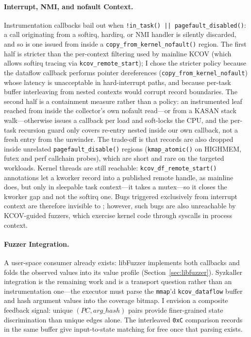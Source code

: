 \documentclass{article}
\begin{document}
\paragraph{Interrupt, NMI, and nofault Context.} Instrumentation callbacks bail
out when \texttt{!in\_task() || pagefault\_disabled()}: a call originating from
a softirq, hardirq, or NMI handler is silently discarded, and so is one issued
from inside a \texttt{copy\_from\_kernel\_nofault()} region.
The first half is stricter than the per-context filtering used by mainline KCOV
(which allows softirq tracing via \texttt{kcov\_remote\_start}); I chose
the stricter policy because the dataflow callback performs pointer
dereferences (\texttt{copy\_from\_kernel\_nofault}) whose latency is
unacceptable in hard-interrupt paths, and because per-task buffer
interleaving from nested contexts would corrupt record boundaries.
The second half is a containment measure rather than a policy: an instrumented
leaf reached from inside the collector's own nofault read---or from a KASAN
stack walk---otherwise issues a callback per load and soft-locks the CPU, and
the per-task recursion guard only covers re-entry nested inside our own
callback, not a fresh entry from the unwinder. The trade-off is that records
are also dropped inside unrelated \texttt{pagefault\_disable()} regions
(\texttt{kmap\_atomic()} on HIGHMEM, futex and perf callchain probes), which
are short and rare on the targeted workloads.
Kernel threads are still reachable: \texttt{kcov\_df\_remote\_start()}
annotations let a kworker record into a published remote handle, as mainline
\kcov{} does, but only in sleepable task context---it takes a mutex---so it
closes the kworker gap and not the softirq one.
Bugs triggered exclusively from interrupt context are therefore invisible
to \toolname{}; however, such bugs are also unreachable by KCOV-guided
fuzzers, which exercise kernel code through syscalls in process context.

\paragraph{Fuzzer Integration.} A user-space consumer already exists: libFuzzer
implements both callbacks and folds the observed values into its value profile
(Section~\ref{sec:libfuzzer}). Syzkaller integration is the remaining work and
is a transport question rather than an instrumentation one---the executor must
parse the \texttt{mmap}'d \texttt{kcov\_dataflow} buffer and hash argument
values into the coverage bitmap. I envision a composite feedback signal: unique
$(\mathit{PC}, \mathit{arg\_hash})$ pairs provide finer-grained state
discrimination than unique edges alone. The interleaved \texttt{0xC} comparison
records in the same buffer give input-to-state matching for free once that
parsing exists.
\end{document}
